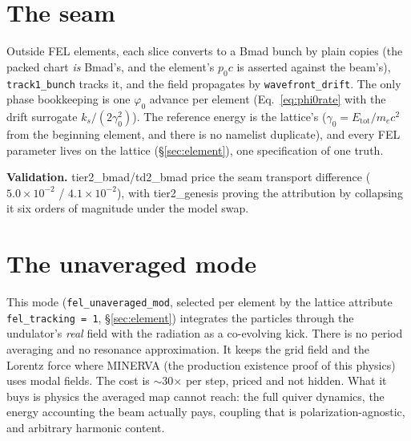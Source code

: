 \documentclass[11pt]{article}
\newcommand{\code}[1]{\texttt{#1}}
\newenvironment{validation}{\par\small\textbf{Validation.}}{\par}
\begin{document}
\section{The seam}\label{sec:seam}

Outside FEL elements, each slice converts to a Bmad bunch by plain copies (the packed
chart \emph{is} Bmad's, and the element's $p_0c$ is asserted against the beam's),
\code{track1\_bunch} tracks it, and the field propagates by \code{wavefront\_drift}.
The only phase bookkeeping is one $\varphi_0$ advance per element
(Eq.~\ref{eq:phi0rate} with the drift surrogate $k_s/(2\gamma_0^2)$). The reference
energy is the lattice's ($\gamma_0 = E_{\mathrm{tot}}/m_ec^2$ from the beginning
element, and there is no namelist duplicate), and every FEL parameter lives on the
lattice (\S\ref{sec:element}), one specification of one truth.

\begin{validation}
tier2\_bmad/td2\_bmad price the seam transport difference ($5.0\times10^{-2}$ /
$4.1\times10^{-2}$), with tier2\_genesis proving the attribution by collapsing it six
orders of magnitude under the model swap.
\end{validation}

\section{The unaveraged mode}\label{sec:unaveraged}

This mode (\code{fel\_unaveraged\_mod}, selected per element by the lattice attribute
\code{fel\_tracking = 1}, \S\ref{sec:element}) integrates the
particles through the undulator's \emph{real} field with the radiation as a
co-evolving kick. There is no period averaging and no resonance approximation. It
keeps the grid field and the Lorentz force where MINERVA (the production existence
proof of this physics) uses modal fields. The cost is $\sim$30$\times$ per step,
priced and not hidden. What it buys is physics the averaged map cannot reach: the
full quiver dynamics, the energy accounting the beam actually pays, coupling that is
polarization-agnostic, and arbitrary harmonic content.
\end{document}
